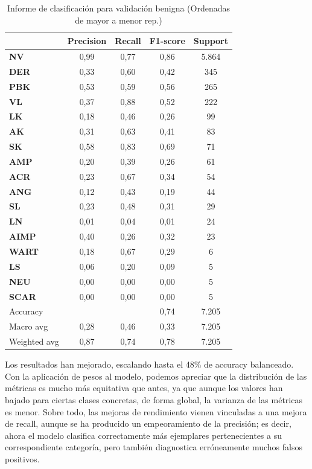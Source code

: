 \begin{table}[!ht]
	\centering
	\begin{tabular}{|l|c|c|c|c|}
		\hline
		& Precision & Recall & F1-score & Support \\
		\hline
	\textbf{NV} & 0,99 & 0,77 & 0,86 & 5.864 \\ \hline
	\textbf{DER} & 0,33 & 0,60 & 0,42 & 345 \\ \hline
	\textbf{PBK} & 0,53 & 0,59 & 0,56 & 265 \\ \hline
	\textbf{VL} & 0,37 & 0,88 & 0,52 & 222 \\ \hline
	\textbf{LK} & 0,18 & 0,46 & 0,26 & 99 \\ \hline
	\textbf{AK} & 0,31 & 0,63 & 0,41 & 83 \\ \hline
	\textbf{SK} & 0,58 & 0,83 & 0,69 & 71 \\ \hline
	\textbf{AMP} & 0,20 & 0,39 & 0,26 & 61 \\ \hline
	\textbf{ACR} & 0,23 & 0,67 & 0,34 & 54 \\ \hline
	\textbf{ANG} & 0,12 & 0,43 & 0,19 & 44 \\ \hline
	\textbf{SL} & 0,23 & 0,48 & 0,31 & 29 \\ \hline
	\textbf{LN} & 0,01 & 0,04 & 0,01 & 24 \\ \hline
	\textbf{AIMP} & 0,40 & 0,26 & 0,32 & 23 \\ \hline
	\textbf{WART} & 0,18 & 0,67 & 0,29 & 6 \\ \hline
	\textbf{LS} & 0,06 & 0,20 & 0,09 & 5 \\ \hline
	\textbf{NEU} & 0,00 & 0,00 & 0,00 & 5 \\ \hline
	\textbf{SCAR} & 0,00 & 0,00 & 0,00 & 5 \\ \hline
		\hline
		Accuracy &  &  & 0,74 & 7.205 \\
		Macro avg & 0,28& 0,46& 0,33&7.205\\
		Weighted avg&0,87&0,74&0,78&7.205\\
		\hline
	\end{tabular}
	\caption{Informe de clasificación para validación benigna (Ordenadas de mayor a menor rep.)}
	\label{tab:benignomalmejormetrics}
\end{table}

Los resultados han mejorado, escalando hasta el 48\% de accuracy balanceado. Con la aplicación de pesos al modelo, podemos apreciar que la distribución de las métricas es mucho  más equitativa que antes, ya que aunque los valores han bajado para ciertas clases concretas, de forma global, la varianza de las métricas es menor. Sobre todo, las mejoras de rendimiento vienen vinculadas a una mejora de recall, aunque se ha producido un empeoramiento de la precisión; es decir, ahora el modelo clasifica correctamente más ejemplares pertenecientes a su correspondiente categoría, pero también diagnostica erróneamente muchos falsos positivos.

